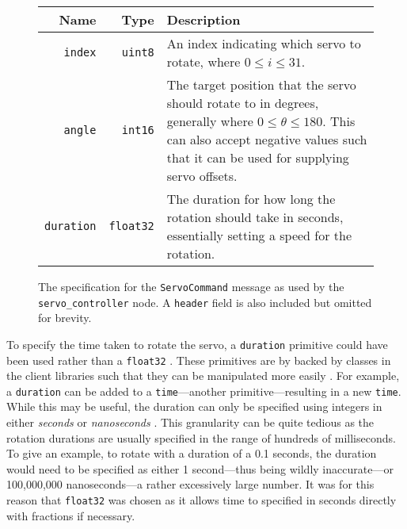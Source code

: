 \begin{figure}[!h]
	\centering
	\begin{tabular}{ r r p{12cm} }
		\textbf{Name} & 
		\textbf{Type} & 
		\textbf{Description} \\
		\hline

		\texttt{index} & 
		\texttt{uint8} &
		An index indicating which servo to rotate, where $0 \leq i \leq 31$. \\
		
		\texttt{angle} & 
		\texttt{int16} & 
		The target position that the servo should rotate to in degrees, generally where $0 \leq \theta \leq 180$. This can also accept negative values such that it can be used for supplying servo offsets. \\
		
		\texttt{duration} &
		\texttt{float32} &
		The duration for how long the rotation should take in seconds, essentially setting a speed for the rotation. \\
	\end{tabular}
	\caption{The specification for the \texttt{ServoCommand} message as used by the \texttt{servo\_controller} node. A \texttt{header} field is also included but omitted for brevity.}
	\label{fig:servocommand_msg}
\end{figure}

To specify the time taken to rotate the servo, a \texttt{duration} primitive could have been used rather than a \texttt{float32} \cite{ros_wiki_msg}. These primitives are by backed by classes in the client libraries such that they can be manipulated more easily \cite{ros_api_duration_msg}. For example, a \texttt{duration} can be added to a \texttt{time}---another primitive---resulting in a new \texttt{time}. While this may be useful, the duration can only be specified using integers in either \emph{seconds} or \emph{nanoseconds} \cite{ros_api_duration_msg}. This granularity can be quite tedious as the rotation durations are usually specified in the range of hundreds of milliseconds. To give an example, to rotate with a duration of a 0.1 seconds, the duration would need to be specified as either 1 second---thus being wildly inaccurate---or 100,000,000 nanoseconds---a rather excessively large number. It was for this reason that \texttt{float32} was chosen as it allows time to specified in seconds directly with fractions if necessary.

